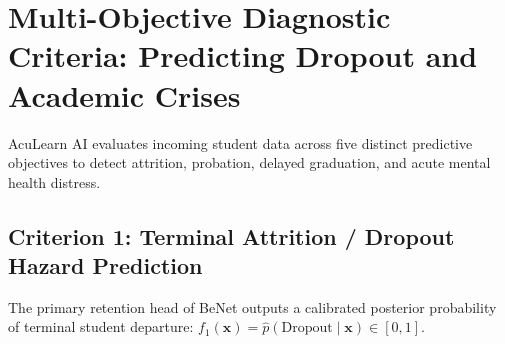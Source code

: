 \documentclass[10pt,a4paper]{article}
\begin{document}
\newpage
\section{Multi-Objective Diagnostic Criteria: Predicting Dropout and Academic Crises}

AcuLearn AI evaluates incoming student data across five distinct predictive objectives to detect attrition, probation, delayed graduation, and acute mental health distress.

\subsection{Criterion 1: Terminal Attrition / Dropout Hazard Prediction}
The primary retention head of BeNet outputs a calibrated posterior probability of terminal student departure:
$f_1(\mathbf{x}) = \hat{p}(\text{Dropout} \mid \mathbf{x}) \in [0, 1]$.
\end{document}
